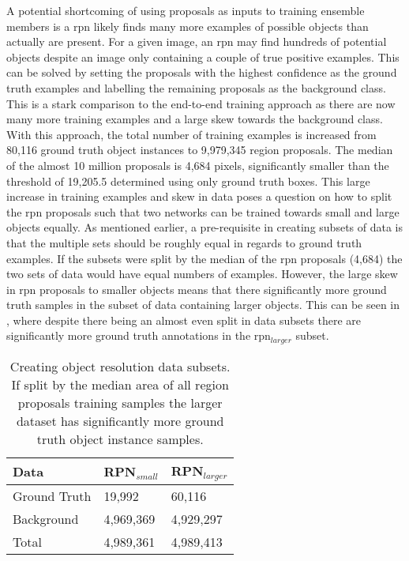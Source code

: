 \documentclass[a4paper,twoside]{article}
\begin{document}
A potential shortcoming of using proposals as inputs to training ensemble members is a \gls{rpn} likely finds many more examples of possible objects than actually are present. For a given image, an \gls{rpn} may find hundreds of potential objects despite an image only containing a couple of true positive examples. This can be solved by setting the proposals with the highest confidence as the ground truth examples and labelling the remaining proposals as the background class. This is a stark comparison to the end-to-end training approach as there are now many more training examples and a large skew towards the background class. With this approach, the total number of training examples is increased from 80,116 ground truth object instances to 9,979,345 region proposals. The median of the almost 10 million proposals is 4,684 pixels, significantly smaller than the threshold of 19,205.5 determined using only ground truth boxes. This large increase in training examples and skew in data poses a question on how to split the \gls{rpn} proposals such that two networks can be trained towards small and large objects equally. As mentioned earlier, a pre-requisite in creating subsets of data is that the multiple sets should be roughly equal in regards to ground truth examples. If the subsets were split by the median of the \gls{rpn} proposals (4,684) the two sets of data would have equal numbers of examples. However, the large skew in \gls{rpn} proposals to smaller objects means that there significantly more ground truth samples in the subset of data containing larger objects. This can be seen in , where despite there being an almost even split in data subsets there are significantly more ground truth annotations in the \gls{rpn}$_{larger}$ subset.

\begin{table}[h]
\centering
\caption{Creating object resolution data subsets. If split by the median area of all region proposals training samples the larger dataset has significantly more ground truth object instance samples.}
\label{tab:splitrpn}
\begin{tabular}{|l|l|l|}
\hline
\textbf{Data} & \textbf{RPN$_{small}$} & \textbf{RPN$_{larger}$} \\ \hline
Ground Truth & 19,992    & 60,116     \\ 
Background   & 4,969,369 & 4,929,297  \\ \hline
Total        & 4,989,361 & 4,989,413  \\ \hline
\end{tabular}
\end{table}
\end{document}
